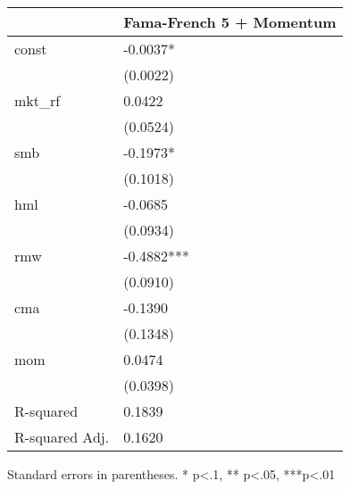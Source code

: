 \begin{table}
\caption{}
\label{}
\begin{center}
\begin{tabular}{ll}
\hline
               & Fama-French 5 + Momentum  \\
\hline
const          & -0.0037*                  \\
               & (0.0022)                  \\
mkt\_rf        & 0.0422                    \\
               & (0.0524)                  \\
smb            & -0.1973*                  \\
               & (0.1018)                  \\
hml            & -0.0685                   \\
               & (0.0934)                  \\
rmw            & -0.4882***                \\
               & (0.0910)                  \\
cma            & -0.1390                   \\
               & (0.1348)                  \\
mom            & 0.0474                    \\
               & (0.0398)                  \\
R-squared      & 0.1839                    \\
R-squared Adj. & 0.1620                    \\
\hline
\end{tabular}
\end{center}
\end{table}
\bigskip
Standard errors in parentheses. \newline 
* p<.1, ** p<.05, ***p<.01